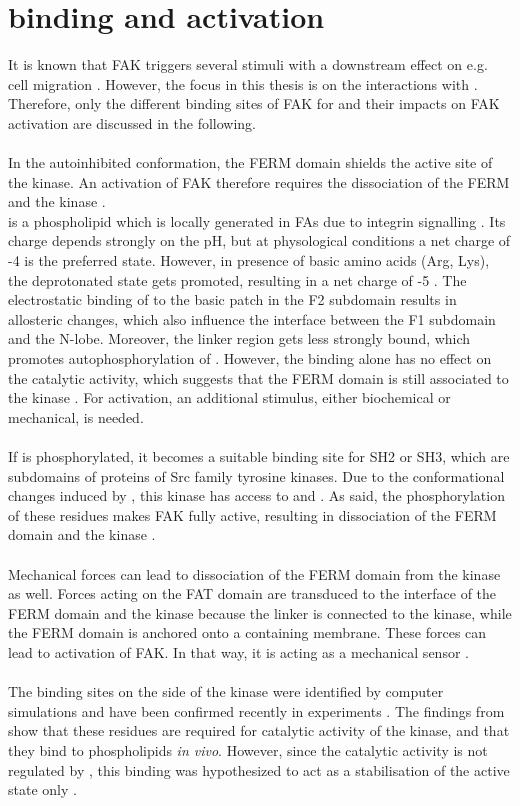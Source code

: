 \section{\pip{} binding and activation}
It is known that FAK triggers several stimuli with a downstream effect on e.g. cell migration \autocite{cellMigration}. However, the focus in this thesis is on the interactions with \pip{}. Therefore, only the different binding sites of FAK for \pip{} and their impacts on FAK activation are discussed in the following.\\
\\
In the autoinhibited conformation, the FERM domain shields the active site of the kinase. An activation of FAK therefore requires the dissociation of the FERM and the kinase \autocite{structFAK}.\\
\pip{} is a phospholipid which is locally generated in FAs due to integrin signalling \autocite{pip2LocalGeneration}. Its charge depends strongly on the pH, but at physological conditions a net charge of -4 is the preferred state. However, in presence of basic amino acids (Arg, Lys), the deprotonated state gets promoted, resulting in a net charge of -5 \autocite{pip2_minus5}. The electrostatic binding of \pip{} to the basic patch in the F2 subdomain results in allosteric changes, which also influence the interface between the F1 subdomain and the N-lobe. Moreover, the linker region gets less strongly bound, which promotes autophosphorylation of . However, the \pip{} binding alone has no effect on the catalytic activity, which suggests that the FERM domain is still associated to the kinase \autocites{pap001}{pap003}. For activation, an additional stimulus, either biochemical or mechanical, is needed.\\
\\
If  is phosphorylated, it becomes a suitable binding site for SH2 or SH3, which are subdomains of proteins of Src family tyrosine kinases. Due to the conformational changes induced by \pip{}, this kinase has access to  and . As said, the phosphorylation of these residues makes FAK fully active, resulting in dissociation of the FERM domain and the kinase \autocite{pap001}.\\
\\
Mechanical forces can lead to dissociation of the FERM domain from the kinase as well. Forces acting on the FAT domain are transduced to the interface of the FERM domain and the kinase because the linker is connected to the kinase, while the FERM domain is anchored onto a \pip{} containing membrane. These forces can lead to activation of FAK. In that way, it is acting as a mechanical sensor \autocite{pap004}.\\
\\
The binding sites on the side of the kinase were identified by computer simulations \autocite{pap002} and have been confirmed recently in experiments \autocite{pap002Exp}. The findings from \textcite{pap002Exp} show that these residues are required for catalytic activity of the kinase, and that they bind to phospholipids \textit{in vivo}. However, since the catalytic activity is not regulated by \pip{}, this binding was hypothesized to act as a stabilisation of the active state only \autocite{pap002Exp}.
